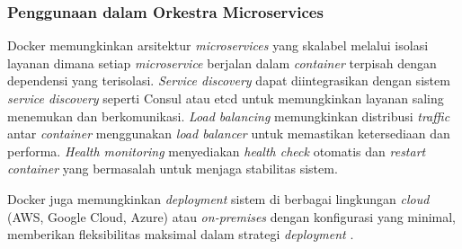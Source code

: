 \subsubsection{Penggunaan dalam Orkestra Microservices}

Docker memungkinkan arsitektur \emph{microservices} yang skalabel melalui isolasi layanan dimana setiap \emph{microservice} berjalan dalam \emph{container} terpisah dengan dependensi yang terisolasi. \emph{Service discovery} dapat diintegrasikan dengan sistem \emph{service discovery} seperti Consul atau etcd untuk memungkinkan layanan saling menemukan dan berkomunikasi. \emph{Load balancing} memungkinkan distribusi \emph{traffic} antar \emph{container} menggunakan \emph{load balancer} untuk memastikan ketersediaan dan performa. \emph{Health monitoring} menyediakan \emph{health check} otomatis dan \emph{restart container} yang bermasalah untuk menjaga stabilitas sistem.

Docker juga memungkinkan \emph{deployment} sistem di berbagai lingkungan \emph{cloud} (AWS, Google Cloud, Azure) atau \emph{on-premises} dengan konfigurasi yang minimal, memberikan fleksibilitas maksimal dalam strategi \emph{deployment} \parencite{ibmcontaineranalysis2017}.
